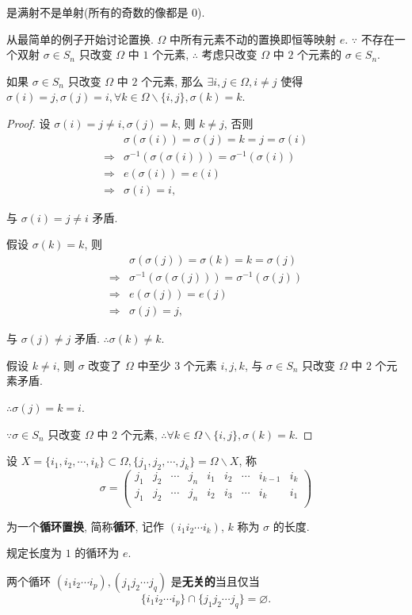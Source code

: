 \documentclass{ctexart}
\begin{document}
是满射不是单射(所有的奇数的像都是 $0$).

从最简单的例子开始讨论置换. $\Omega$ 中所有元素不动的置换即恒等映射 $e$. $\because$ 不存在一个双射 $\sigma\in S_n$ 只改变 $\Omega$ 中 $1$ 个元素, $\therefore$ 考虑只改变 $\Omega$ 中 $2$ 个元素的 $\sigma\in S_n$.
\begin{lemma}
    如果 $\sigma\in S_n$ 只改变 $\Omega$ 中 $2$ 个元素, 那么 $\exists i,j\in\Omega,i\neq j$ 使得 $\sigma(i)=j,\sigma(j)=i,\forall k\in\Omega\backslash\{i,j\},\sigma(k)=k$.
\end{lemma}
\begin{proof}
    设 $\sigma(i)=j\neq i,\sigma(j)=k$, 则 $k\neq j$, 否则
    \begin{align*}
        & \sigma(\sigma(i))=\sigma(j)=k=j=\sigma(i) \\
        \Rightarrow & \sigma^{-1}(\sigma(\sigma(i)))=\sigma^{-1}(\sigma(i)) \\
        \Rightarrow & e(\sigma(i))=e(i) \\
        \Rightarrow & \sigma(i)=i,
    \end{align*}

    与 $\sigma(i)=j\neq i$ 矛盾.

    假设 $\sigma(k)=k$, 则
    \begin{align*}
        & \sigma(\sigma(j))=\sigma(k)=k=\sigma(j) \\
        \Rightarrow & \sigma^{-1}(\sigma(\sigma(j)))=\sigma^{-1}(\sigma(j)) \\
        \Rightarrow & e(\sigma(j))=e(j) \\
        \Rightarrow & \sigma(j)=j,
    \end{align*}
    
    与 $\sigma(j)\neq j$ 矛盾. $\therefore\sigma(k)\neq k$.
    
    假设 $k\neq i$, 则 $\sigma$ 改变了 $\Omega$ 中至少 $3$ 个元素 $i,j,k$, 与 $\sigma\in S_n$ 只改变 $\Omega$ 中 $2$ 个元素矛盾.

    $\therefore\sigma(j)=k=i$.

    $\because\sigma\in S_n$ 只改变 $\Omega$ 中 $2$ 个元素, $\therefore\forall k\in\Omega\backslash\{i,j\},\sigma(k)=k.$
\end{proof}
\begin{definition}
    设 $X=\{i_1,i_2,\cdots,i_k\}\subset\Omega,\{j_1,j_2,\cdots,j_k\}=\Omega\backslash X$, 称
    \[\sigma=\begin{pmatrix}
        j_1 & j_2 & \cdots & j_n & i_1 & i_2 & \cdots & i_{k-1} & i_k \\
        j_1 & j_2 & \cdots & j_n & i_2 & i_3 & \cdots & i_k & i_1 \\
    \end{pmatrix}\]

    为一个\textbf{循环置换}, 简称\textbf{循环}, 记作 $(i_1i_2\cdots i_k)$, $k$ 称为 $\sigma$ 的长度.

    规定长度为 $1$ 的循环为 $e$.
\end{definition}
\begin{definition}
    两个循环 $(i_1i_2\cdots i_p),(j_1j_2\cdots j_q)$ 是\textbf{无关的}当且仅当
    \[\{i_1i_2\cdots i_p\}\cap\{j_1j_2\cdots j_q\}=\varnothing.\]
\end{definition}
\end{document}
